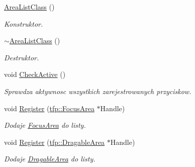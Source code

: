 \begin{DoxyCompactItemize}
\item 
\mbox{\label{classtfp_1_1_area_list_class_a9e47bb9ce47041d33a73a88e71a4350e}} 
\mbox{\hyperlink{classtfp_1_1_area_list_class_a9e47bb9ce47041d33a73a88e71a4350e}{Area\+List\+Class}} ()
\begin{DoxyCompactList}\small\item\em Konstruktor. \end{DoxyCompactList}\item 
\mbox{\label{classtfp_1_1_area_list_class_aa53838a627b15e1988980be05a896620}} 
\mbox{\hyperlink{classtfp_1_1_area_list_class_aa53838a627b15e1988980be05a896620}{$\sim$\+Area\+List\+Class}} ()
\begin{DoxyCompactList}\small\item\em Destruktor. \end{DoxyCompactList}\item 
void \mbox{\hyperlink{classtfp_1_1_area_list_class_a3c71f74eefdaa9751bcbe185899f905b}{Check\+Active}} ()
\begin{DoxyCompactList}\small\item\em Sprawdza aktywnosc wszystkich zarejestrowanych przyciskow. \end{DoxyCompactList}\item 
\mbox{\label{classtfp_1_1_area_list_class_ab9cc46b4a7f4400512b84200b049e564}} 
void \mbox{\hyperlink{classtfp_1_1_area_list_class_ab9cc46b4a7f4400512b84200b049e564}{Register}} (\mbox{\hyperlink{classtfp_1_1_focus_area}{tfp\+::\+Focus\+Area}} $\ast$Handle)
\begin{DoxyCompactList}\small\item\em Dodaje \mbox{\hyperlink{classtfp_1_1_focus_area}{Focus\+Area}} do listy. \end{DoxyCompactList}\item 
\mbox{\label{classtfp_1_1_area_list_class_a4c2d3c40101633251cd50aae1fb4cc8d}} 
void \mbox{\hyperlink{classtfp_1_1_area_list_class_a4c2d3c40101633251cd50aae1fb4cc8d}{Register}} (\mbox{\hyperlink{classtfp_1_1_dragable_area}{tfp\+::\+Dragable\+Area}} $\ast$Handle)
\begin{DoxyCompactList}\small\item\em Dodaje \mbox{\hyperlink{classtfp_1_1_dragable_area}{Dragable\+Area}} do listy. \end{DoxyCompactList}\item 

\end{DoxyCompactItemize}
